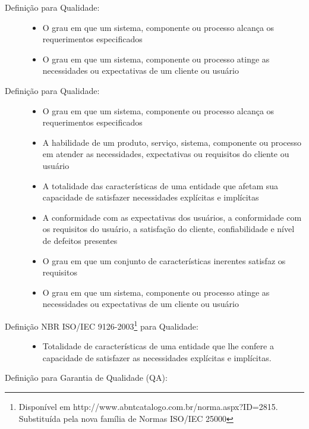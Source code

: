 \documentclass[
	12pt,				%
	openright,			%
	twoside,			%
	a4paper,			%
	english,			%
	brazil,				%
	]{abntex2}
\begin{document}
\begin{description}
    \item[Definição  para Qualidade:] \hfill
        \begin{itemize}
            \item O grau em que um sistema, componente ou processo alcança os requerimentos especificados
            \item O grau em que um sistema, componente ou processo atinge as necessidades ou expectativas de um cliente ou usuário
        \end{itemize}
    \item[Definição  para Qualidade:] \hfill
        \begin{itemize}
            \item O grau em que um sistema, componente ou processo alcança os requerimentos especificados
            \item A habilidade de um produto, serviço, sistema, componente ou processo em atender as necessidades, expectativas ou requisitos do cliente ou usuário
            \item A totalidade das características de uma entidade que afetam sua capacidade de satisfazer necessidades explícitas e implícitas
            \item A conformidade com as expectativas dos usuários, a conformidade com os requisitos do usuário, a satisfação do cliente, confiabilidade e nível de defeitos presentes
            \item O grau em que um conjunto de características inerentes satisfaz os requisitos
            \item O grau em que um sistema, componente ou processo atinge as necessidades ou expectativas de um cliente ou usuário
        \end{itemize}
    \item[Definição NBR ISO/IEC 9126-2003\protect\footnote{Disponível em http://www.abntcatalogo.com.br/norma.aspx?ID=2815. Substituída pela nova família de Normas ISO/IEC 25000} para Qualidade:] \hfill %
        \begin{itemize}
            \item  Totalidade de características de uma entidade que lhe confere a capacidade de satisfazer as necessidades explícitas e implícitas.
        \end{itemize}
    \item[Definição  para Garantia de Qualidade (QA):] \hfill

\end{description}
\end{document}
